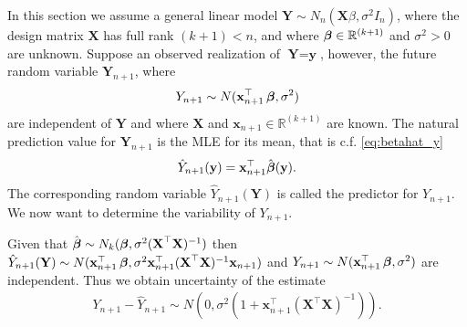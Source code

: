 In this section we assume a general linear model $\textbf{Y}\sim N_n(\textbf{X}\beta, \sigma^2 I_n)$, where the design matrix $\textbf{X}$ has full rank $(k+1)<n$, and where $\operatorname{\boldsymbol{\beta}} \in \mathbb{R}^{(k+1)}$ and $\sigma^2>0$ are unknown. Suppose an observed realization of $\textbf{Y}=\textbf{y}$, however, the future random variable $\textbf{Y}_{n+1}$, where
\begin{align*}
    Y_{n+1}\sim N(\textbf{x}^\top_{n+1}\operatorname{\boldsymbol{\beta}},\sigma^2)
\end{align*}
are independent of $\textbf{Y}$ and where $\textbf{X}$ and $\textbf{x}_{n+1}\in\mathbb{R}^{(k+1)}$ are known. 
The natural prediction value for $\textbf{Y}_{n+1}$ is the MLE for its mean, that is c.f. \eqref{eq:betahat_y}
\begin{align*}
    \hat{Y}_{n+1}(\textbf{y})=\textbf{x}^\top_{n+1}\hat{\operatorname{\boldsymbol{\beta}}}(\textbf{y}).
\end{align*}
The corresponding random variable $\hat{Y}_{n+1}(\textbf{Y})$ is called the predictor for $Y_{n+1}$. 
We now want to determine the variability of $Y_{n+1}$.

Given that $\hat{\operatorname{\boldsymbol{\beta}}} \sim N_k(\operatorname{\boldsymbol{\beta}},\sigma^2(\textbf{X}^\top\textbf{X})^{-1})$ then $\hat{Y}_{n+1}(\textbf{Y})\sim N(\textbf{x}^\top_{n+1}\operatorname{\boldsymbol{\beta}},\sigma^2\textbf{x}^\top_{n+1}(\textbf{X}^\top\textbf{X})^{-1}\textbf{x}_{n+1})$ and $Y_{n+1}\sim N(\textbf{x}^\top_{n+1}\operatorname{\boldsymbol{\beta}},\sigma^2)$ are independent.
Thus we obtain uncertainty of the estimate
\begin{align*}
    Y_{n+1}-\hat{Y}_{n+1} \sim N(0, \sigma^2(1+\textbf{x}^\top_{n+1}(\textbf{X}^\top\textbf{X})^{-1})).
\end{align*}

